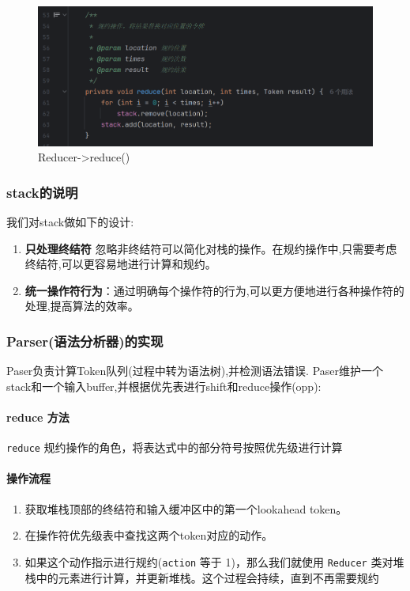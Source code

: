 \documentclass{article}
\begin{document}
\begin{figure}[H]
    \centering
    \includegraphics[width=0.6\linewidth]{reuce2.png}
    \caption{Reducer->reduce()}
    \label{fig:reuce2}
\end{figure}


\newpage
\subsubsection{stack的说明}
我们对stack做如下的设计:
\begin{enumerate}
    \item \textbf{只处理终结符} 忽略非终结符可以简化对栈的操作。在规约操作中,只需要考虑终结符,可以更容易地进行计算和规约。
    \item \textbf{统一操作符行为}：通过明确每个操作符的行为,可以更方便地进行各种操作符的处理,提高算法的效率。
\end{enumerate}

\subsubsection{Parser(语法分析器)的实现}
Paser负责计算Token队列(过程中转为语法树),并检测语法错误.
Paser维护一个stack和一个输入buffer,并根据优先表进行shift和reduce操作(opp):
\paragraph{reduce 方法}
\texttt{reduce} 规约操作的角色，将表达式中的部分符号按照优先级进行计算

\paragraph{操作流程}
\begin{enumerate}
    \item 获取堆栈顶部的终结符和输入缓冲区中的第一个lookahead token。
    \item 在操作符优先级表中查找这两个token对应的动作。
    \item 如果这个动作指示进行规约(\texttt{action} 等于 1)，那么我们就使用 \texttt{Reducer} 类对堆栈中的元素进行计算，并更新堆栈。这个过程会持续，直到不再需要规约
\end{enumerate}
\end{document}
